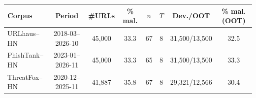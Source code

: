 \begin{tabular}{lccccccc}
\toprule
Corpus & Period & \#URLs & \% mal. & $n$ & $T$ & Dev./OOT & \% mal. (OOT) \\
\midrule
URLhaus--HN & 2018-03--2026-10 & 45,000 & 33.3 & 67 & 8 & 31,500/13,500 & 32.5 \\
PhishTank--HN & 2023-01--2026-11 & 45,000 & 33.3 & 65 & 8 & 31,500/13,500 & 33.3 \\
ThreatFox--HN & 2020-12--2025-11 & 41,887 & 35.8 & 67 & 8 & 29,321/12,566 & 30.4 \\
\bottomrule
\end{tabular}
